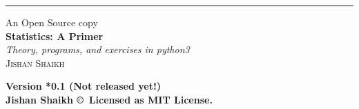\documentclass[a4paper,12pt]{book}
\begin{document}
	\begin{titlepage}		
		\raggedleft 
		\rule{1pt}{\textheight} 
		\hspace{0.05\textwidth} %
		\parbox[b]{0.75\textwidth}{ %
			{\large{An Open Source copy}}\\[\baselineskip]
			{\Huge\bfseries Statistics: A Primer}\\[2\baselineskip] 
			{\large\textit{Theory, programs, and exercises in python3}}\\[4\baselineskip] 
			{\Large\textsc{Jishan Shaikh}}
			
			\vspace{0.5\textheight} %
			{\noindent\textbf{Version *0.1 (Not released yet!)}}\\[\baselineskip]
			{\noindent \textbf{Jishan Shaikh \copyright \ Licensed as MIT License.}}\\[\baselineskip]
		}
	\end{titlepage}
\frontmatter
\tableofcontents
\mainmatter

\backmatter
\end{document}
